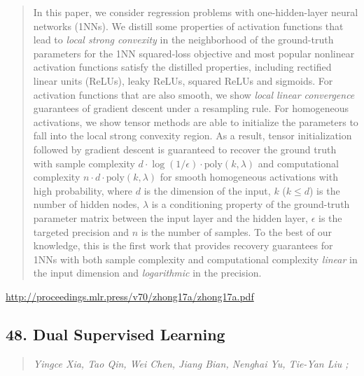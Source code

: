 \documentclass{article}
\begin{document}
\begin{quote}
    In this paper, we consider regression problems with one-hidden-layer neural networks (1NNs). We distill some properties of activation functions that lead to   \textit{local strong convexity} in the neighborhood of the ground-truth parameters for the 1NN squared-loss objective and most popular nonlinear activation functions  satisfy the distilled properties, including rectified linear units (ReLUs), leaky ReLUs, squared ReLUs and sigmoids. For activation functions that are also smooth, we show \textit{local linear convergence} guarantees of gradient descent under a resampling rule. For homogeneous activations, we show tensor methods are able to initialize the parameters to fall into the local strong convexity region. As a result, tensor initialization followed by gradient descent is guaranteed to recover the ground truth with sample complexity $ d \cdot \log(1/\epsilon) \cdot \mathrm{poly}(k,\lambda )$ and computational complexity $n\cdot d \cdot \mathrm{poly}(k,\lambda) $ for smooth  homogeneous activations with high probability, where $d$ is the dimension of the input, $k$ ($k\leq d$) is the number of hidden nodes, $\lambda$ is a conditioning  property of the ground-truth parameter matrix between the input layer and the hidden layer, $\epsilon$ is the targeted precision and $n$ is the number of samples. To the best of our knowledge, this is the first work that provides recovery guarantees for 1NNs with both sample complexity and computational complexity \textit{linear} in the input dimension and \textit{logarithmic} in the precision.  \end{quote}

\href{http://proceedings.mlr.press/v70/zhong17a/zhong17a.pdf}{http://proceedings.mlr.press/v70/zhong17a/zhong17a.pdf}

\subsection{48. Dual Supervised Learning}

\begin{quote}
\footnotesize{\textit{Yingce Xia, Tao Qin, Wei Chen, Jiang Bian, Nenghai Yu, Tie-Yan Liu ;}}
\end{quote}
\end{document}
